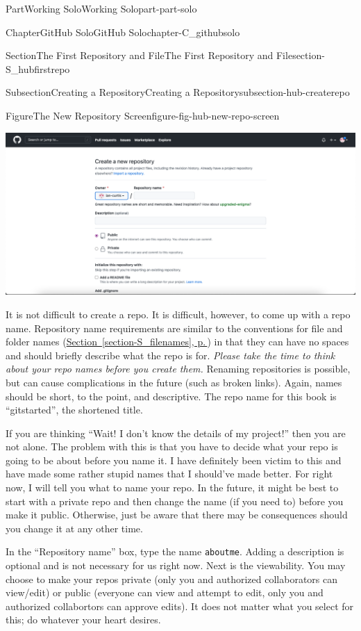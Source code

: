 \documentclass[twoside,10pt,]{book}
\newcommand{\xreffont}{\relax}
\newcommand{\mono}[1]{\texttt{#1}}
\begin{document}
\begin{partptx}{Part}{Working Solo}{}{Working Solo}{}{}{part-part-solo}
\begin{chapterptx}{Chapter}{GitHub Solo}{}{GitHub Solo}{}{}{chapter-C_githubsolo}
\begin{sectionptx}{Section}{The First Repository and File}{}{The First Repository and File}{}{}{section-S_hubfirstrepo}
\begin{subsectionptx}{Subsection}{Creating a Repository}{}{Creating a Repository}{}{}{subsection-hub-createrepo}
\begin{figureptx}{Figure}{The New Repository Screen}{figure-fig-hub-new-repo-screen}{}
\begin{image}{0.05}{0.9}{0.05}{}%
\includegraphics[width=\linewidth]{external/hub_new_repo_screen.pdf}
\end{image}%
\tcblower
\end{figureptx}%
It is not difficult to create a repo. It is difficult, however, to come up with a repo name. Repository name requirements are similar to the conventions for file and folder names (\hyperref[section-S_filenames]{Section~{\xreffont\ref{section-S_filenames}}, p.\,\pageref{section-S_filenames}}) in that they can have no spaces and should briefly describe what the repo is for. \emph{Please take the time to think about your repo names before you create them.} Renaming repositories is possible, but can cause complications in the future (such as broken links). Again, names should be short, to the point, and descriptive. The repo name for this book is ``gitstarted'', the shortened title.%
\par
If you are thinking ``Wait! I don't know the details of my project!'' then you are not alone. The problem with this is that you have to decide what your repo is going to be about before you name it. I have definitely been victim to this and have made some rather stupid names that I should've made better. For right now, I will tell you what to name your repo. In the future, it might be best to start with a private repo and then change the name (if you need to) before you make it public. Otherwise, just be aware that there may be consequences should you change it at any other time.%
\par
In the ``Repository name'' box, type the name \mono{aboutme}. Adding a description is optional and is not necessary for us right now. Next is the viewability. You may choose to make your repos private (only you and authorized collaborators can view\slash{}edit) or public (everyone can view and attempt to edit, only you and authorized collabortors can approve edits). It does not matter what you select for this; do whatever your heart desires.%

\end{subsectionptx}
\end{sectionptx}
\end{chapterptx}
\end{partptx}
\end{document}
